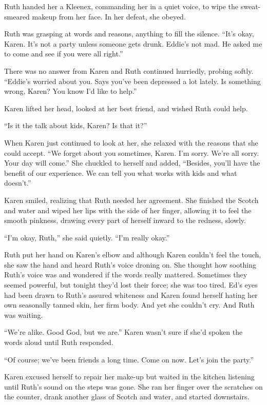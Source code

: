 \documentclass[twoside,10pt]{book}
\begin{document}
Ruth handed her a Kleenex, commanding her in a quiet voice, to wipe the
sweat-smeared makeup from her face. In her defeat, she obeyed.

Ruth was grasping at words and reasons, anything to fill the silence.
``It's okay, Karen. It's not a party unless someone gets drunk. Eddie's
not mad. He asked me to come and see if you were all right.''

There was no answer from Karen and Ruth continued hurriedly, probing
softly. ``Eddie's worried about you. Says you've been depressed a lot
lately. Is something wrong, Karen? You know I'd like to help.''

Karen lifted her head, looked at her best friend, and wished Ruth could
help.

``Is it the talk about kids, Karen? Is that it?''

When Karen just continued to look at her, she relaxed with the reasons
that she could accept. ``We forget about you sometimes, Karen. I'm
sorry. We're all sorry. Your day will come.'' She chuckled to herself
and added, ``Besides, you'll have the benefit of our experience. We can
tell you what works with kids and what doesn't.''

Karen smiled, realizing that Ruth needed her agreement. She finished the
Scotch and water and wiped her lips with the side of her finger,
allowing it to feel the smooth pinkness, drawing every part of herself
inward to the redness, slowly.

``I'm okay, Ruth,'' she said quietly. ``I'm really okay.''

Ruth put her hand on Karen's elbow and although Karen couldn't feel the
touch, she saw the hand and heard Ruth's voice droning on. She thought
how soothing Ruth's voice was and wondered if the words really mattered.
Sometimes they seemed powerful, but tonight they'd lost their force; she
was too tired. Ed's eyes had been drawn to Ruth's assured whiteness and
Karen found herself hating her own seasonally tanned skin, her firm
body. And yet she couldn't cry. And Ruth was waiting.

``We're alike. Good God, but we are.'' Karen wasn't sure if she'd spoken
the words aloud until Ruth responded.

``Of course; we've been friends a long time. Come on now. Let's join the
party.''

Karen excused herself to repair her make-up but waited in the kitchen
listening until Ruth's sound on the steps was gone. She ran her finger
over the scratches on the counter, drank another glass of Scotch and
water, and started downstairs.
\end{document}
